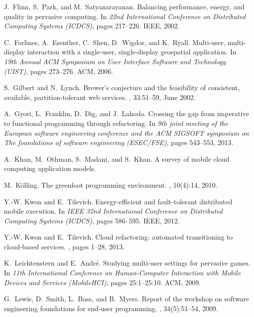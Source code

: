 \documentclass[article]{sigplanconf}
\begin{document}
\begin{thebibliography}{10}
J.~Flinn, S.~Park, and M.~Satyanarayanan.
\newblock Balancing performance, energy, and quality in pervasive computing.
\newblock In {\em 22nd International Conference on Distributed Computing
  Systems (ICDCS)}, pages 217--226. IEEE, 2002.

C.~Forlines, A.~Esenther, C.~Shen, D.~Wigdor, and K.~Ryall.
\newblock Multi-user, multi-display interaction with a single-user,
  single-display geospatial application.
\newblock In {\em 19th Annual ACM Symposium on User Interface Software and
  Technology (UIST)}, pages 273--276. ACM, 2006.

S.~Gilbert and N.~Lynch.
\newblock Brewer's conjecture and the feasibility of consistent, available,
  partition-tolerant web services.
, 33:51--59, June 2002.

A.~Gyori, L.~Franklin, D.~Dig, and J.~Lahoda.
\newblock Crossing the gap from imperative to functional programming through
  refactoring.
\newblock In {\em 9th joint meeting of the European software engineering
  conference and the ACM SIGSOFT symposium on The foundations of software
  engineering (ESEC/FSE)}, pages 543--553, 2013.

A.~Khan, M.~Othman, S.~Madani, and S.~Khan.
\newblock A survey of mobile cloud computing application models.

M.~K{\"o}lling.
\newblock The greenfoot programming environment.
, 10(4):14, 2010.

Y.-W. Kwon and E.~Tilevich.
\newblock Energy-efficient and fault-tolerant distributed mobile execution.
\newblock In {\em IEEE 32nd International Conference on Distributed Computing
  Systems (ICDCS)}, pages 586--595. IEEE, 2012.

Y.-W. Kwon and E.~Tilevich.
\newblock Cloud refactoring: automated transitioning to cloud-based services.
, pages 1--28, 2013.

K.~Leichtenstern and E.~Andr{\'e}.
\newblock Studying multi-user settings for pervasive games.
\newblock In {\em 11th International Conference on Human-Computer Interaction
  with Mobile Devices and Services (MobileHCI)}, pages 25:1--25:10. ACM, 2009.

G.~Lewis, D.~Smith, L.~Bass, and B.~Myers.
\newblock Report of the workshop on software engineering foundations for
  end-user programming.
, 34(5):51--54, 2009.


\end{thebibliography}
\end{document}
